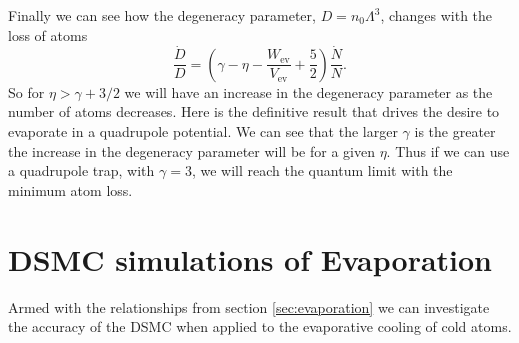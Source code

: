 Finally we can see how the degeneracy parameter, $D=n_0\Lambda^3$, changes with the loss of atoms
\begin{equation}
    \frac{\dot{D}}{D} = \left(\gamma -\eta -\frac{W_\mathrm{ev}}{V_\mathrm{ev}} +\frac{5}{2}\right) \frac{\dot{N}}{N}.
\end{equation}
So for $\eta > \gamma + 3/2$ we will have an increase in the degeneracy parameter as the number of atoms decreases.
Here is the definitive result that drives the desire to evaporate in a quadrupole potential.
We can see that the larger $\gamma$ is the greater the increase in the degeneracy parameter will be for a given $\eta$.
Thus if we can use a quadrupole trap, with $\gamma = 3$, we will reach the quantum limit with the minimum atom loss.


\section{DSMC simulations of Evaporation} \label{sec:dsmcevaporation}

Armed with the relationships from section \ref{sec:evaporation} we can investigate the accuracy of the DSMC when applied to the evaporative cooling of cold atoms.

